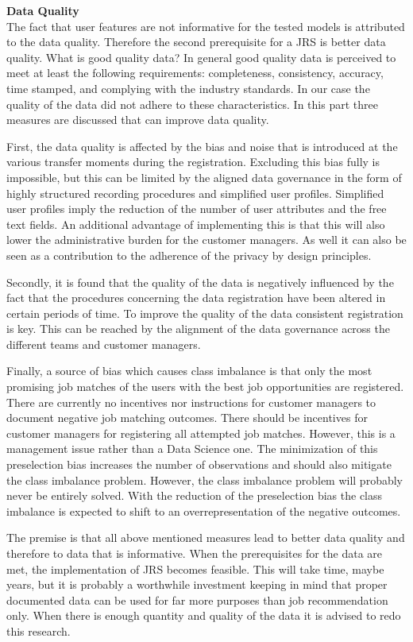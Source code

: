 \noindent
\textbf{Data Quality}\\
The fact that user features are not informative for the tested models is attributed to the data quality. 
Therefore the second prerequisite for a JRS is better data quality.
What is good quality data?
In general good quality data is perceived to meet at least the following requirements: completeness, consistency, accuracy, time stamped, and complying with the industry standards. 
In our case the quality of the data did not adhere to these characteristics. 
In this part three measures are discussed that can improve data quality.

First, the data quality is affected by the bias and noise that is introduced at the various transfer moments during the registration.
Excluding this bias fully is impossible, but this can be limited by the aligned data governance in the form of highly structured recording procedures and simplified user profiles.
Simplified user profiles imply the reduction of the number of user attributes and the free text fields. 
An additional advantage of implementing this is that this will also lower the administrative burden for the customer managers.
As well it can also be seen as a contribution to the adherence of the privacy by design principles. 

Secondly, it is found that the quality of the data is negatively influenced by the fact that the procedures concerning the data registration have been altered in certain periods of time. 
To improve the quality of the data consistent registration is key.
This can be reached by the alignment of the data governance across the different teams and customer managers.

Finally, a source of bias which causes class imbalance is that only the most promising job matches of the users with the best job opportunities are registered. 
There are currently no incentives nor instructions for customer managers to document negative job matching outcomes. 
There should be incentives for customer managers for registering all attempted job matches.
However, this is a management issue rather than a Data Science one.
The minimization of this preselection bias increases the number of observations and should also mitigate the class imbalance problem.
However, the class imbalance problem will probably never be entirely solved.
With the reduction of the preselection bias the class imbalance is expected to shift to an overrepresentation of the negative outcomes.

The premise is that all above mentioned measures lead to better data quality and therefore to data that is informative.
When the prerequisites for the data are met, the implementation of JRS becomes feasible.
This will take time, maybe years, but it is probably a worthwhile investment keeping in mind that proper documented data can be used for far more purposes than job recommendation only.
When there is enough quantity and quality of the data it is advised to redo this research. 
